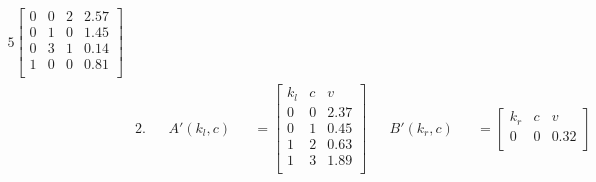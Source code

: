 \begin{figure}[H]
\begin{alignat*}{5}
\begin{bmatrix}
                                                               0 & 0 & 2   & 2.57 \\
                                                               0 & 1 & 0   & 1.45 \\
                                                               0 & 3 & 1   & 0.14 \\
                                                               1 & 0 & 0   & 0.81 \\
                                                           \end{bmatrix}
        \\
         & 2.          &              & A'(k_l, c)     &                                                                                      & = \begin{bmatrix}
                                                                                                                                                      k_l & c & v    \\
                                                                                                                                                      0   & 0 & 2.37 \\
                                                                                                                                                      0   & 1 & 0.45 \\
                                                                                                                                                      1   & 2 & 0.63 \\
                                                                                                                                                      1   & 3 & 1.89 \\
                                                                                                                                                  \end{bmatrix}
         &             & B'(k_r, c)   &                & = \begin{bmatrix}
                                                               k_r & c & v    \\
                                                               0   & 0 & 0.32 \\

\end{bmatrix}
\end{alignat*}
\end{figure}
